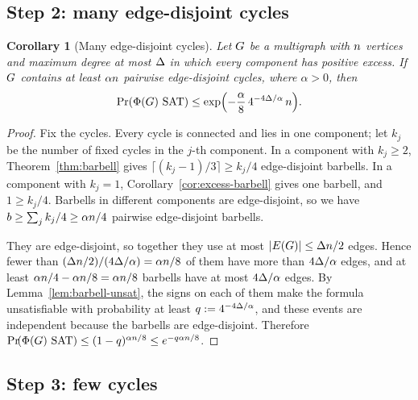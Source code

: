 \documentclass[11pt,a4paper]{article}
\newtheorem{corollary}[theorem]{Corollary}
\theoremstyle{definition}
\theoremstyle{remark}
\theoremstyle{plain}
\theoremstyle{definition}
\begin{document}
\subsection{Step 2: many edge-disjoint cycles}

\begin{corollary}[Many edge-disjoint cycles]\label{cor:many-cycles}
Let \(G\) be a multigraph with \(n\) vertices and maximum degree at most
\(\Delta\) in which every component has positive excess. If \(G\) contains at
least \(\alpha n\) pairwise edge-disjoint cycles, where \(\alpha>0\), then
\[
  \Prx{\rform{\Gin}\SAT}\le\exp\Bigl(-\frac\alpha8\,4^{-4\degb/\alpha}\,\nvert\Bigr).
\]
\end{corollary}

\begin{proof}
Fix the cycles. Every cycle is connected and lies in one component; let
\(k_j\) be the number of fixed cycles in the \(j\)-th component. In a
component with \(k_j\ge2\), Theorem~\ref{thm:barbell} gives
\(\lceil(k_j-1)/3\rceil\ge k_j/4\) edge-disjoint barbells. In a component with
\(k_j=1\), Corollary~\ref{cor:excess-barbell} gives one barbell, and
\(1\ge k_j/4\). Barbells in different components are edge-disjoint, so we have
\(b\ge\sum_jk_j/4\ge\alpha n/4\) pairwise edge-disjoint barbells.

They are edge-disjoint, so together they use at most
\(|E(G)|\le\Delta n/2\) edges. Hence fewer than
\((\Delta n/2)/(4\Delta/\alpha)=\alpha n/8\) of them have more than
\(4\Delta/\alpha\) edges, and at least \(\alpha n/4-\alpha n/8=\alpha n/8\)
barbells have at most \(4\Delta/\alpha\) edges. By Lemma~\ref{lem:barbell-unsat}, the signs on each
of them make the formula unsatisfiable with probability at least
\(q:=4^{-4\Delta/\alpha}\), and these events are independent because the
barbells are edge-disjoint. Therefore
\(\Prx{\rform{\Gin}\SAT}\le(1-q)^{\alpha \nvert/8}\le e^{-q\alpha \nvert/8}\).
\end{proof}

\subsection{Step 3: few cycles}
\end{document}
